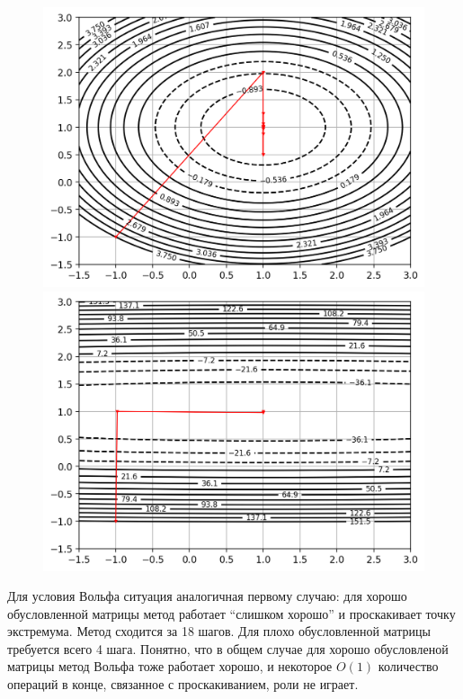 \documentclass[notitlepage]{article}
\begin{document}
\begin{figure}[ht]
\begin{minipage}[t]{.5\textwidth}
  \centering
  \includegraphics[width=\textwidth, keepaspectratio]{plots/trajectory_0_2.png}
\end{minipage}
\begin{minipage}[t]{.5\textwidth}
  \centering
  \includegraphics[width=\textwidth, keepaspectratio]{plots/trajectory_1_2.png}
\end{minipage}
\end{figure}
Для условия Вольфа ситуация аналогичная первому случаю: для хорошо обусловленной матрицы метод работает ``слишком хорошо'' и
проскакивает точку экстремума. Метод сходится за 18 шагов. Для плохо обусловленной матрицы требуется всего 4 шага.
Понятно, что в общем случае для хорошо обусловленой матрицы метод Вольфа тоже работает хорошо, и некоторое $O(1)$ количество
операций в конце, связанное с проскакиванием, роли не играет.
\end{document}
